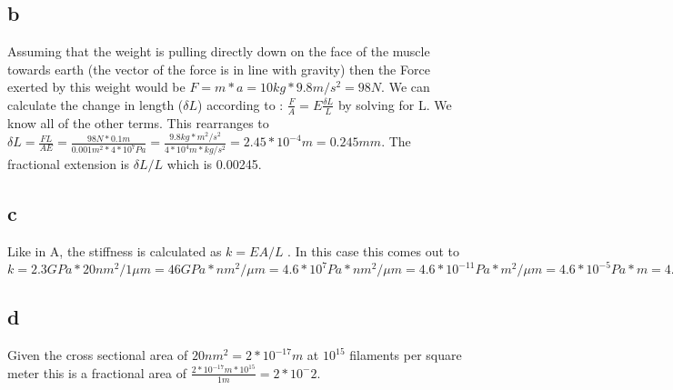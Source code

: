 \documentclass[12pt]{article}
\begin{document}
\subsection{b}
Assuming that the weight is pulling directly down on the face of the muscle towards earth (the vector of the force is in line with gravity) then the Force exerted by this weight would be $F = m*a = 10 kg * 9.8 m/s^2 = 98 N$. We can calculate the change in length ($\delta L$) according to : $\frac{F}{A} = E\frac{\delta L}{L}$ by solving for L. We know all of the other terms. This rearranges to $\delta L = \frac{FL}{AE} = \frac{98 N*0.1 m}{0.001 m^2 * 4*10^7 Pa} =   \frac{9.8 kg*m^2 / s^2}{ 4*10^4 m*kg/s^2} = 2.45*10^{-4}m = 0.245 mm$. The fractional extension is $\delta L/L$ which is 0.00245.

\subsection{c}
Like in A, the stiffness is calculated as $k = {EA}/L$ . In this case this comes out to $k = 2.3GPa*20 nm^2 / 1 \mu m = 46 GPa*nm^2/\mu  m = 4.6*10^7 Pa*nm^2/\mu  m = 4.6*10^{-11}Pa*m^2/\mu  m = 4.6*10^{-5}Pa*m = 4.6*10^{-5} kg/s^2$

\subsection{d}
Given the cross sectional area of $20 nm^2 = 2*10^{-17}m$ at $10^{15}$ filaments per square meter this is a fractional area of $\frac{2*10^{-17} m * 10^{15} }{ 1 m} = 2*10^-2$. 
\end{document}
